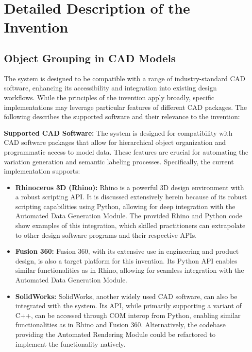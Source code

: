 \documentclass{article}
\begin{document}
\section{Detailed Description of the Invention}

\subsection{Object Grouping in CAD Models}

The system is designed to be compatible with a range of industry-standard CAD software, enhancing its accessibility and integration into existing design workflows. While the principles of the invention apply broadly, specific implementations may leverage particular features of different CAD packages. The following describes the supported software and their relevance to the invention:

\textbf{Supported CAD Software:} The system is designed for compatibility with CAD software packages that allow for hierarchical object organization and programmatic access to model data. These features are crucial for automating the variation generation and semantic labeling processes. Specifically, the current implementation supports:

\begin{itemize}
    \item \textbf{Rhinoceros 3D (Rhino):} Rhino is a powerful 3D design environment with a robust scripting API. It is discussed extensively herein because of its robust scripting capabilities using Python, allowing for deep integration with the Automated Data Generation Module. The provided Rhino and Python code show examples of this integration, which skilled practitioners can extrapolate to other design software programs and their respective APIs. 
    \item \textbf{Fusion 360:} Fusion 360, with its extensive use in engineering and product design, is also a target platform for this invention. Its Python API enables similar functionalities as in Rhino, allowing for seamless integration with the Automated Data Generation Module.
    \item \textbf{SolidWorks:} SolidWorks, another widely used CAD software, can also be integrated with the system. Its API, while primarily supporting a variant of C++, can be accessed through COM interop from Python, enabling similar functionalities as in Rhino and Fusion 360. Alternatively, the codebase providing the Automated Rendering Module could be refactored to implement the functionality natively.
\end{itemize}
\end{document}
